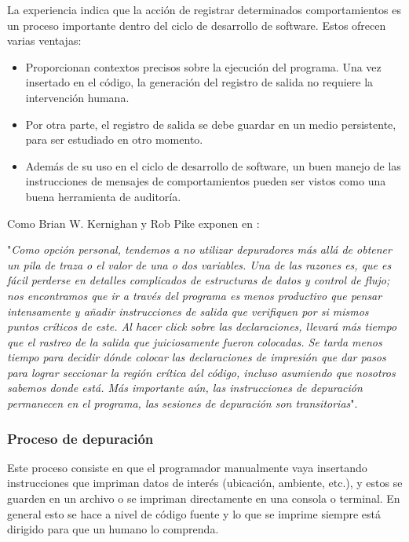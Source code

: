 \documentclass[12pt,legalpaper]{report}
\begin{document}
La experiencia indica que la acción de registrar determinados comportamientos es un proceso importante dentro del ciclo de desarrollo de software. Estos ofrecen varias ventajas:
\begin{itemize}
	\item Proporcionan contextos precisos sobre la ejecución del programa. Una vez insertado en el código, la generación del registro de salida no requiere la intervención humana.
	\item Por otra parte, el registro de salida se debe guardar en un medio persistente, para ser estudiado en otro momento.
	\item Además de su uso en el ciclo de desarrollo de software, un buen manejo de las instrucciones de mensajes de comportamientos pueden ser vistos como una buena herramienta de auditoría.
\end{itemize}


Como Brian W. Kernighan y Rob Pike exponen en \cite{thePracticeOfProgramming}:

"\textit{Como opción personal, tendemos a no utilizar depuradores más allá de obtener un pila de traza o el valor de una o dos variables. Una de las razones es, que es fácil perderse en detalles complicados de estructuras de datos y control de flujo; nos encontramos que ir a través del programa es menos productivo que pensar intensamente y añadir instrucciones de salida que verifiquen por si mismos puntos críticos de este. Al hacer click sobre las declaraciones, llevará más tiempo que el rastreo de la salida que juiciosamente fueron colocadas. Se tarda menos tiempo para decidir dónde colocar las declaraciones de impresión que dar pasos para lograr seccionar la región crítica del código, incluso asumiendo que nosotros sabemos donde está. Más importante aún, las instrucciones de depuración permanecen en el programa, las sesiones de depuración son transitorias}".

			\subsubsection{Proceso de depuración}

Este proceso consiste en que el programador manualmente vaya insertando instrucciones que impriman datos de interés (ubicación, ambiente, etc.), y estos se guarden en un archivo o se impriman directamente en una consola o terminal.  En general esto se hace a nivel de código fuente y lo que se imprime siempre está dirigido para que un humano lo comprenda.
\end{document}
